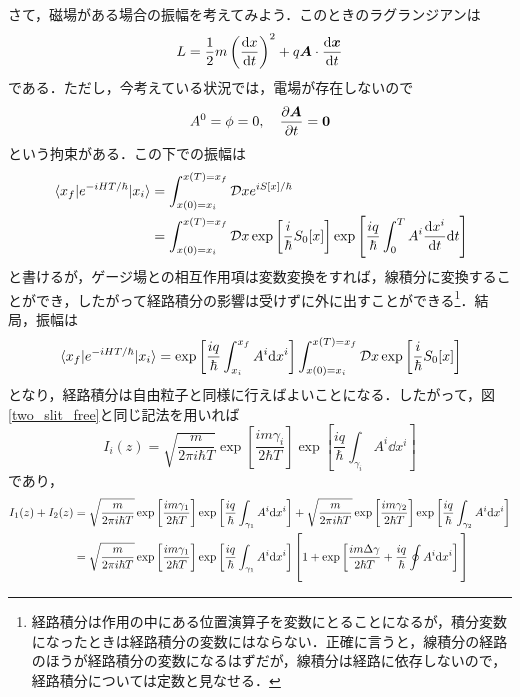 \documentclass[a4paper,pdflatex,ja=standard]{bxjsarticle}
\begin{document}
さて，磁場がある場合の振幅を考えてみよう．このときのラグランジアンは
\begin{equation}
  L
  =
  \frac{1}{2}m\left( \dv{x}{t} \right)^2
  +
  q\bm{A}\cdot\dv{\bm{x}}{t}
  \label{lagrangian}
\end{equation}
である．ただし，今考えている状況では，電場が存在しないので
\begin{equation}
  A^{0}=\phi=0
  ,\quad
  \pdv{\bm{A}}{t}
  =
  \bm{0}
\end{equation}
という拘束がある．この下での振幅は
\begin{align}
  \ev*{x_{f}|e^{-iHT/\hbar}|x_i}
  &=
  \int_{x(0)=x_i}^{x(T)=x_f}\mathcal{D}x
  e^{iS[x]/\hbar}
  \nonumber
  \\
  &=
  \int_{x(0)=x_i}^{x(T)=x_f}\mathcal{D}x
  \exp
  \left[ \frac{i}{\hbar}S_0[x] \right]
  \exp\left[ \frac{iq}{\hbar}\int_{0}^{T}A^{i}\dv{x^i}{t}\dd t \right]
\end{align}
と書けるが，ゲージ場との相互作用項は変数変換をすれば，線積分に変換することができ，したがって経路積分の影響は受けずに外に出すことができる\footnote{
  経路積分は作用の中にある位置演算子を変数にとることになるが，積分変数になったときは経路積分の変数にはならない．正確に言うと，線積分の経路のほうが経路積分の変数になるはずだが，線積分は経路に依存しないので，経路積分については定数と見なせる．
}．結局，振幅は
\begin{equation}
  \ev*{x_{f}|e^{-iHT/\hbar}|x_i}
  =
  \exp\left[ \frac{iq}{\hbar}\int_{x_i}^{x_f}A^{i}\dd x^{i} \right]
  \int_{x(0)=x_i}^{x(T)=x_f}\mathcal{D}x
  \exp
  \left[ \frac{i}{\hbar}S_0[x] \right]  
\end{equation}
となり，経路積分は自由粒子と同様に行えばよいことになる．したがって，図\ref{two_slit_free}と同じ記法を用いれば
\begin{equation}
  I_{i}(z)
  =
  \sqrt{\frac{m}{2\pi i\hbar T}}
  \exp
  \left[ \frac{im\gamma_i}{2\hbar T} \right]
  \exp\left[ \frac{iq}{\hbar}\int_{\gamma_i}A^{i}\dd x^{i} \right]
\end{equation}
であり，
\begin{align}
  I_1(z)
  +
  I_2(z)
  &=
  \sqrt{\frac{m}{2\pi i\hbar T}}
  \exp
  \left[ \frac{im\gamma_1}{2\hbar T} \right]
  \exp\left[ \frac{iq}{\hbar}\int_{\gamma_1}A^{i}\dd x^{i} \right]
  +
  \sqrt{\frac{m}{2\pi i\hbar T}}
  \exp
  \left[ \frac{im\gamma_2}{2\hbar T} \right]
  \exp\left[ \frac{iq}{\hbar}\int_{\gamma_2}A^{i}\dd x^{i} \right]
  \nonumber
  \\
  &=
  \sqrt{\frac{m}{2\pi i\hbar T}}
  \exp
  \left[ \frac{im\gamma_1}{2\hbar T} \right]
  \exp\left[ \frac{iq}{\hbar}\int_{\gamma_1}A^{i}\dd x^{i} \right]
  \left[  
    1
    +
    \exp
    \left[  
      \frac{im\Delta\gamma}{2\hbar T}
      +\frac{iq}{\hbar}\oint A^{i}\dd x^{i}
    \right]
    \vphantom{\dfrac{\dfrac{1}{2}}{2}}
  \right]
\end{align}
\end{document}
